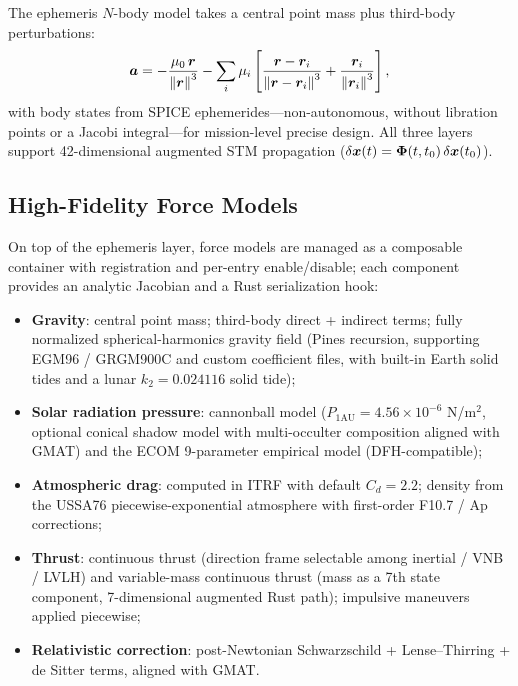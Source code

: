 The ephemeris $N$-body model takes a central point mass plus third-body
perturbations:
\begin{equation}
  \bm{a} = -\frac{\mu_0\,\bm{r}}{\left\lVert \bm{r} \right\rVert^3}
  - \sum_i \mu_i \left[
    \frac{\bm{r} - \bm{r}_i}{\left\lVert \bm{r} - \bm{r}_i \right\rVert^3}
    + \frac{\bm{r}_i}{\left\lVert \bm{r}_i \right\rVert^3}
  \right],
\end{equation}
with body states from SPICE ephemerides---non-autonomous, without libration
points or a Jacobi integral---for mission-level precise design. All three
layers support 42-dimensional augmented STM propagation
($\delta\bm{x}(t) = \bm{\Phi}(t, t_0)\,\delta\bm{x}(t_0)$).

\subsection{High-Fidelity Force Models}

On top of the ephemeris layer, force models are managed as a composable
container with registration and per-entry enable/disable; each component
provides an analytic Jacobian and a Rust serialization hook:

\begin{itemize}
  \item \textbf{Gravity}: central point mass; third-body direct + indirect
        terms; fully normalized spherical-harmonics gravity field (Pines
        recursion, supporting EGM96 / GRGM900C and custom coefficient files,
        with built-in Earth solid tides and a lunar $k_2 = 0.024116$ solid
        tide);
  \item \textbf{Solar radiation pressure}: cannonball model
        ($P_{1\mathrm{AU}} = 4.56\times10^{-6}$ N/m$^2$, optional conical
        shadow model with multi-occulter composition aligned with GMAT) and
        the ECOM 9-parameter empirical model (DFH-compatible);
  \item \textbf{Atmospheric drag}: computed in ITRF with default
        $C_d = 2.2$; density from the USSA76 piecewise-exponential atmosphere
        with first-order F10.7 / Ap corrections;
  \item \textbf{Thrust}: continuous thrust (direction frame selectable among
        inertial / VNB / LVLH) and variable-mass continuous thrust (mass as a
        7th state component, 7-dimensional augmented Rust path); impulsive
        maneuvers applied piecewise;
  \item \textbf{Relativistic correction}: post-Newtonian Schwarzschild +
        Lense--Thirring + de Sitter terms, aligned with GMAT.
\end{itemize}

